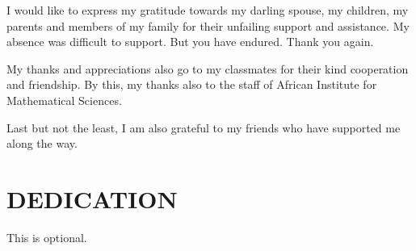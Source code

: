I would like to express my gratitude towards  my darling spouse, my children, my parents and members  of my family for their unfailing support and assistance. My absence was difficult to support. But you have endured. Thank you again.

My thanks and appreciations also go to my classmates for their kind cooperation and friendship. By this, my thanks also to the staff of African Institute for Mathematical Sciences.

Last but not the least, I am also grateful to my friends who have supported me along the way.

\newpage
\chapter*{DEDICATION} 

This is optional.